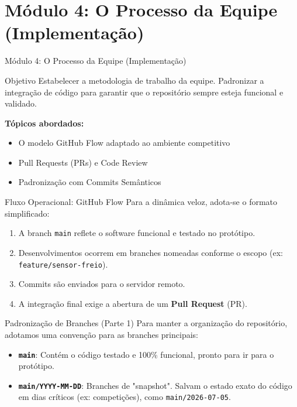\documentclass[10pt,aspectratio=169]{beamer}
\begin{document}
\section{Módulo 4: O Processo da Equipe (Implementação)}

\begin{frame}{Módulo 4: O Processo da Equipe (Implementação)}
    \begin{block}{Objetivo}
        Estabelecer a metodologia de trabalho da equipe. Padronizar a integração de código para garantir que o repositório sempre esteja funcional e validado.
    \end{block}
    \vspace{0.5cm}
    \textbf{Tópicos abordados:}
    \begin{itemize}
        \item O modelo GitHub Flow adaptado ao ambiente competitivo
        \item Pull Requests (PRs) e Code Review
        \item Padronização com Commits Semânticos
    \end{itemize}
\end{frame}

\begin{frame}{Fluxo Operacional: GitHub Flow}
    Para a dinâmica veloz, adota-se o formato simplificado:
    \vspace{0.3cm}
    \begin{enumerate}
        \item A branch \texttt{main} reflete o software funcional e testado no protótipo.
        \item Desenvolvimentos ocorrem em branches nomeadas conforme o escopo (ex: \texttt{feature/sensor-freio}).
        \item Commits são enviados para o servidor remoto.
        \item A integração final exige a abertura de um \textbf{Pull Request} (PR).
    \end{enumerate}
\end{frame}

\begin{frame}{Padronização de Branches (Parte 1)}
    Para manter a organização do repositório, adotamos uma convenção para as branches principais:
    \vspace{0.3cm}
    \begin{itemize}
        \item \textbf{\texttt{main}}: Contém o código testado e 100\% funcional, pronto para ir para o protótipo.
        \item \textbf{\texttt{main/YYYY-MM-DD}}: Branches de "snapshot". Salvam o estado exato do código em dias críticos (ex: competições), como \texttt{main/2026-07-05}.
    \end{itemize}
\end{frame}
\end{document}
